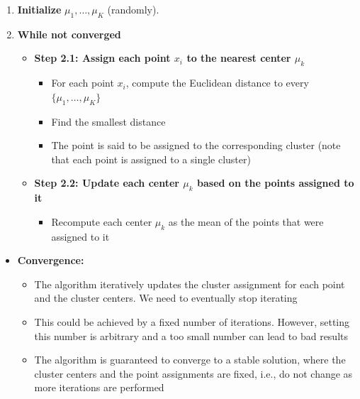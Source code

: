 \documentclass[11pt,a4paper,openany]{book}
\begin{document}
\begin{algbox}[title=K-Means Algorithm]
\begin{enumerate}
    \item \textbf{Initialize} {\(\mu_1,\ldots,\mu_K\)} (randomly).
    \item \textbf{While not converged}
    \begin{itemize}
        \item \textbf{Step 2.1: Assign each point \(x_i\) to the nearest center \(\mu_k\)}

        \begin{itemize}
            \item For each point \(x_i\), compute the Euclidean distance to every $\{\mu_1, \dots, \mu_K\}$
            \item Find the smallest distance
            \item The point is said to be assigned to the corresponding cluster
            (note that each point is assigned to a single cluster)
        \end{itemize}

        \item \textbf{Step 2.2: Update each center \(\mu_k\) based on the points assigned to it}

        \begin{itemize}
            \item Recompute each center \(\mu_k\) as the mean of the points that were assigned to it
        \end{itemize}
    \end{itemize}
\end{enumerate}
\begin{itemize}
    \item \textbf{Convergence:}
    \begin{itemize}
        \item The algorithm iteratively updates the cluster assignment for each point and
        the cluster centers. We need to eventually stop iterating
        
        \item This could be achieved by a fixed number of iterations. However, setting this
        number is arbitrary and a too small number can lead to bad results
        
        \item The algorithm is guaranteed to converge to a stable solution, where the
        cluster centers and the point assignments are fixed, i.e., do not change as
        more iterations are performed
        

\end{itemize}
\end{itemize}
\end{algbox}
\end{document}
